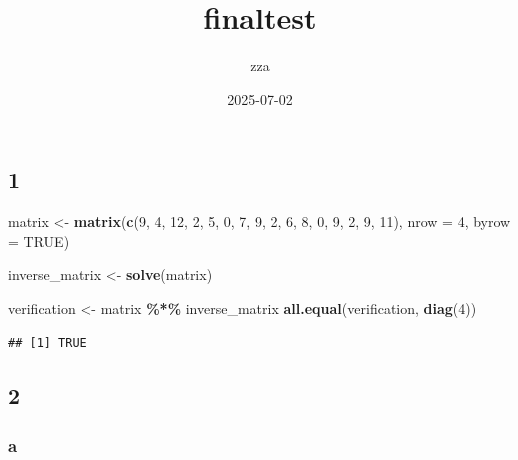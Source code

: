 \documentclass[
]{article}
\title{finaltest}
\author{zza}
\date{2025-07-02}
\newenvironment{Shaded}{\begin{snugshade}}{\end{snugshade}}
\newcommand{\AttributeTok}[1]{\textcolor[rgb]{0.13,0.29,0.53}{#1}}
\newcommand{\ConstantTok}[1]{\textcolor[rgb]{0.56,0.35,0.01}{#1}}
\newcommand{\DecValTok}[1]{\textcolor[rgb]{0.00,0.00,0.81}{#1}}
\newcommand{\FunctionTok}[1]{\textcolor[rgb]{0.13,0.29,0.53}{\textbf{#1}}}
\newcommand{\NormalTok}[1]{#1}
\newcommand{\OtherTok}[1]{\textcolor[rgb]{0.56,0.35,0.01}{#1}}
\newcommand{\SpecialCharTok}[1]{\textcolor[rgb]{0.81,0.36,0.00}{\textbf{#1}}}
\begin{document}
\maketitle

\subsection{1}\label{section}

\begin{Shaded}
\begin{Highlighting}[]
\NormalTok{matrix }\OtherTok{\textless{}{-}} \FunctionTok{matrix}\NormalTok{(}\FunctionTok{c}\NormalTok{(}\DecValTok{9}\NormalTok{, }\DecValTok{4}\NormalTok{, }\DecValTok{12}\NormalTok{, }\DecValTok{2}\NormalTok{,}
                   \DecValTok{5}\NormalTok{, }\DecValTok{0}\NormalTok{, }\DecValTok{7}\NormalTok{, }\DecValTok{9}\NormalTok{,}
                   \DecValTok{2}\NormalTok{, }\DecValTok{6}\NormalTok{, }\DecValTok{8}\NormalTok{, }\DecValTok{0}\NormalTok{,}
                   \DecValTok{9}\NormalTok{, }\DecValTok{2}\NormalTok{, }\DecValTok{9}\NormalTok{, }\DecValTok{11}\NormalTok{), }
                 \AttributeTok{nrow =} \DecValTok{4}\NormalTok{, }\AttributeTok{byrow =} \ConstantTok{TRUE}\NormalTok{)}


\NormalTok{inverse\_matrix }\OtherTok{\textless{}{-}} \FunctionTok{solve}\NormalTok{(matrix)}


\NormalTok{verification }\OtherTok{\textless{}{-}}\NormalTok{ matrix }\SpecialCharTok{\%*\%}\NormalTok{ inverse\_matrix}
\FunctionTok{all.equal}\NormalTok{(verification, }\FunctionTok{diag}\NormalTok{(}\DecValTok{4}\NormalTok{))}
\end{Highlighting}
\end{Shaded}

\begin{verbatim}
## [1] TRUE
\end{verbatim}

\subsection{2}\label{section-1}

\subsubsection{a}\label{a}
\end{document}

